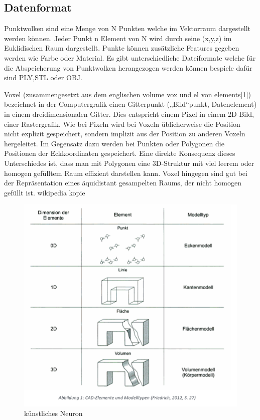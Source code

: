 \documentclass{llncs}
\begin{document}
\subsection{Datenformat}

Punktwolken sind eine Menge von N Punkten welche im Vektorraum dargestellt werden können. Jeder Punkt n Element von N wird durch seine (x,y,z) im Euklidischen Raum dargestellt. Punkte können zusätzliche Features gegeben werden wie Farbe oder Material. Es gibt unterschiedliche Dateiformate welche für die Abspeicherung von Punktwolken herangezogen werden können bespiele dafür sind PLY,STL oder OBJ. 

Voxel (zusammengesetzt aus dem englischen volume vox und el von elements[1]) bezeichnet in der Computergrafik einen Gitterpunkt („Bild“punkt, Datenelement) in einem dreidimensionalen Gitter. Dies entspricht einem Pixel in einem 2D-Bild, einer Rastergrafik. Wie bei Pixeln wird bei Voxeln üblicherweise die Position nicht explizit gespeichert, sondern implizit aus der Position zu anderen Voxeln hergeleitet. Im Gegensatz dazu werden bei Punkten oder Polygonen die Positionen der Eckkoordinaten gespeichert. Eine direkte Konsequenz dieses Unterschiedes ist, dass man mit Polygonen eine 3D-Struktur mit viel leerem oder homogen gefülltem Raum effizient darstellen kann. Voxel hingegen sind gut bei der Repräsentation eines äquidistant gesampelten Raums, der nicht homogen gefüllt ist. wikipedia kopie


\begin{figure}[htbp] 
	\centering
	\includegraphics[width=1.0\textwidth]{datenformat.png}
	\caption{künstliches Neuron}
	\label{fig:Bild1}
\end{figure}
\end{document}
